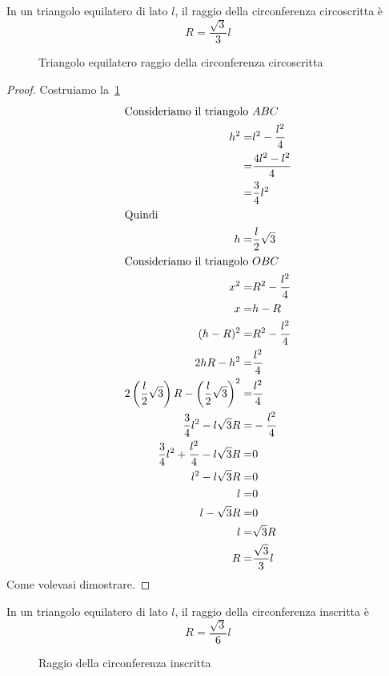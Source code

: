 \begin{thm}\label{thm:raggiocirconferenzacircoscritta}
	In un triangolo equilatero di lato $l$, il raggio della circonferenza circoscritta è \[R=\dfrac{\sqrt{3}}{3}l\]
\end{thm}
\begin{figure}
	\centering
	
	\caption{Triangolo equilatero raggio della circonferenza circoscritta}
	\label{fig:raggiocirconferenzacircoscritta}
\end{figure}
\begin{proof}
	Costruiamo la~\cref{fig:raggiocirconferenzacircoscritta}
	\begin{align*}
		\intertext{Consideriamo il triangolo $ABC$}
		h^2=&l^2-\dfrac{l^2}{4}\\
		=&\dfrac{4l^2-l^2}{4}\\
		=&\dfrac{3}{4}l^2\\
		\intertext{Quindi}
		h=&\dfrac{l}{2}\sqrt{3}\\
		\intertext{Consideriamo il triangolo $OBC$}
		x^2=&R^2-\dfrac{l^2}{4}\\
		x=&h-R\\
		(h-R)^2=&R^2-\dfrac{l^2}{4}\\
		2hR-h^2=&\dfrac{l^2}{4}\\
		2\left(\dfrac{l}{2}\sqrt{3}\right)R-\left(\dfrac{l}{2}\sqrt{3}\right)^2=&\dfrac{l^2}{4}\\
		\dfrac{3}{4}l^2-l\sqrt{3}R=&-\dfrac{l^2}{4}\\
		\dfrac{3}{4}l^2+\dfrac{l^2}{4}-l\sqrt{3}R=&0\\
		l^2-l\sqrt{3}R=&0\\
		l=&0\\
		l-\sqrt{3}R=&0\\
		l=&\sqrt{3}R\\
		R=&\dfrac{\sqrt{3}}{3}l
	\end{align*}
	Come volevasi dimostrare.
\end{proof}
\begin{thm}\label{thm:raggiocirconferenzainscritta}
	In un triangolo equilatero di lato $l$, il raggio della circonferenza inscritta è \[R=\dfrac{\sqrt{3}}{6}l\]
\end{thm}
\begin{figure}
	\centering
	
	\caption{Raggio della circonferenza inscritta}
	\label{fig:raggiocirconferenzainscritta}
\end{figure}
